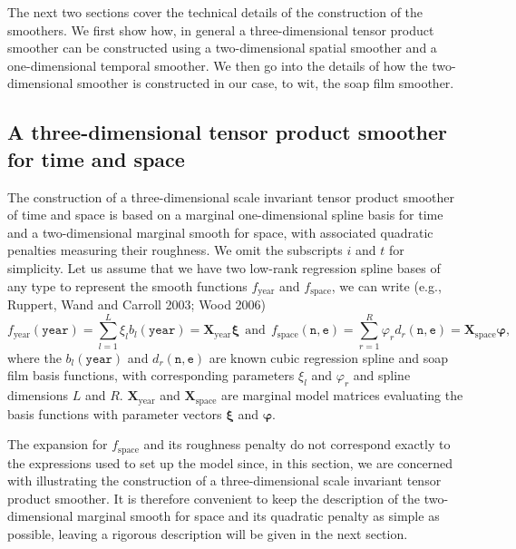 \documentclass[10pt]{article}
\theoremstyle{definition}
\theoremstyle{plain}
\begin{document}
The next two sections cover the technical details of the construction of the smoothers. We first show how, in general a three-dimensional tensor product smoother can be constructed using a two-dimensional spatial smoother and a one-dimensional temporal smoother. We then go into the details of how the two-dimensional smoother is constructed in our case, to wit, the soap film smoother.

\subsection{A three-dimensional tensor product smoother for time and space \label{3D}}

The construction of a three-dimensional scale invariant tensor product smoother of time and space is based on a marginal one-dimensional spline basis for time and a two-dimensional marginal smooth for space, with associated quadratic penalties measuring their roughness. We omit the subscripts $i$ and $t$ for simplicity. Let us assume that we have two low-rank regression spline bases of any type to represent the smooth functions $f_\text{year}$ and $f_\text{space}$, we can write (e.g., Ruppert, Wand and Carroll 2003; Wood 2006)
$$
f_\text{year}(\texttt{year})=\sum_{l=1}^L \xi_l b_l(\texttt{year})=\textbf{X}_\text{year}\bm\xi \ \ \text{and} \ \ f_\text{space}(\texttt{n},\texttt{e})=\sum_{r=1}^R \varphi_r d_r(\texttt{n},\texttt{e})=\textbf{X}_\text{space}\bm\varphi,
$$
where the $b_l(\texttt{year})$ and $d_r(\texttt{n},\texttt{e})$ are known cubic regression spline and soap film basis functions, with corresponding parameters $\xi_l$ and $\varphi_r$ and spline dimensions $L$ and $R$. $\textbf{X}_\text{year}$ and $\textbf{X}_\text{space}$ are marginal model matrices evaluating the basis functions with parameter vectors $\bm\xi$ and $\bm\varphi$. 

The expansion for $f_\text{space}$ and its roughness penalty do not correspond exactly to the expressions used to set up the model since, in this section, we are concerned with illustrating the construction of a three-dimensional scale invariant tensor product smoother. It is therefore convenient to keep the description of the two-dimensional marginal smooth for space and its quadratic penalty as simple as possible, leaving a rigorous description will be given in the next section. 
\end{document}

